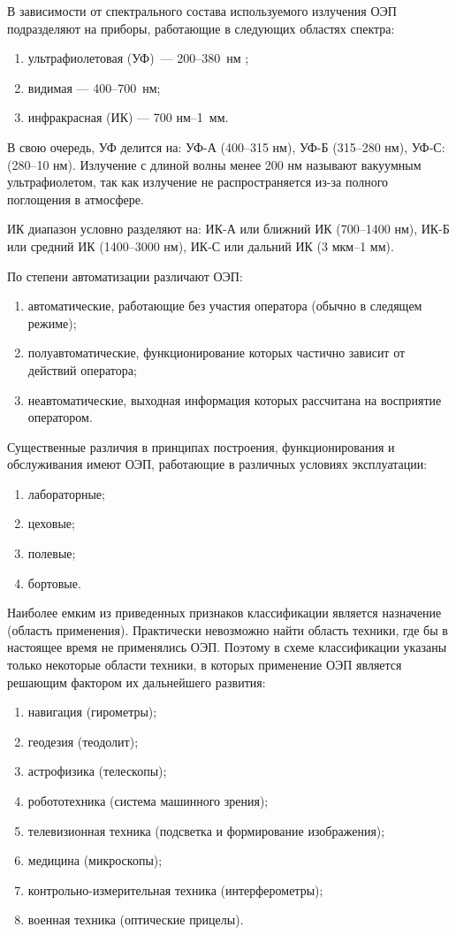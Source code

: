 В зависимости от спектрального состава используемого излучения ОЭП подразделяют на приборы, работающие в следующих областях спектра:
\begin{enumerate}
	\item ультрафиолетовая (УФ)~--- 200--380~нм ;
	\item видимая --- 400--700~нм;
	\item инфракрасная (ИК) --- 700 нм--1~мм.
\end{enumerate}

В свою очередь, УФ делится на: УФ-А (400--315 нм), УФ-Б (315--280 нм), УФ-С: (280--10 нм). Излучение с длиной волны менее 200 нм называют вакуумным ультрафиолетом, так как излучение не распространяется из-за полного поглощения в атмосфере.

ИК диапазон условно разделяют на: ИК-А или ближний ИК (700--1400 нм), ИК-Б или средний ИК (1400--3000 нм), ИК-С или дальний ИК (3 мкм--1 мм).

По степени автоматизации различают ОЭП:
\begin{enumerate}
	\item автоматические, работающие без участия оператора (обычно в следящем режиме);
	\item полуавтоматические, функционирование которых частично зависит от действий оператора;
	\item неавтоматические, выходная информация которых рассчитана на восприятие оператором.
\end{enumerate}

Существенные различия в принципах построения, функционирования и обслуживания имеют ОЭП, работающие в различных условиях эксплуатации:
\begin{enumerate}
	\item лабораторные;
	\item цеховые;
	\item полевые;
	\item бортовые.
\end{enumerate}

Наиболее емким из приведенных признаков классификации является назначение (область применения). Практически невозможно найти область техники, где бы в настоящее время не применялись ОЭП. Поэтому в схеме классификации указаны только некоторые области техники, в которых применение ОЭП является решающим фактором их дальнейшего развития: 
\begin{enumerate}
	\item навигация (гирометры);
	\item геодезия (теодолит);
	\item астрофизика (телескопы);
	\item робототехника (система машинного зрения);
	\item телевизионная техника (подсветка и формирование изображения);
	\item медицина (микроскопы);
	\item контрольно-измерительная техника (интерферометры);
	\item военная техника (оптические прицелы).
\end{enumerate}

